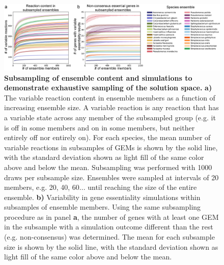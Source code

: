 \documentclass[11pt,onecolumn,notitlepage,openany,twoside]{book}
\begin{document}
\begin{refsection}
\begin{figure}[tb]
\centering
\includegraphics[width=\textwidth]{ch3_fig2}
\caption[ Subsampling of ensemble content and simulations to demonstrate exhaustive sampling of the solution space.]{\textbf{ Subsampling of ensemble content and simulations to demonstrate exhaustive sampling of the solution space.} \textbf{a)} The variable reaction content in ensemble members as a function of increasing ensemble size. A variable reaction is any reaction that has a variable state across any member of the subsampled group (e.g. it is off in some members and on in some members, but neither entirely off nor entirely on). For each species, the mean number of variable reactions in subsamples of GEMs is shown by the solid line, with the standard deviation shown as light fill of the same color above and below the mean. Subsampling was performed with 1000 draws per subsample size. Ensembles were sampled at intervals of 20 members, e.g. 20, 40, 60... until reaching the size of the entire ensemble. \textbf{b)} Variability in gene essentiality simulations within subsamples of ensemble members. Using the same subsampling procedure as in panel \textbf{a}, the number of genes with at least one GEM in the subsample with a simulation outcome different than the rest (e.g. non-consensus) was determined. The mean for each subsample size is shown by the solid line, with the standard deviation shown as light fill of the same color above and below the mean.}
\end{figure}


\end{refsection}
\end{document}
